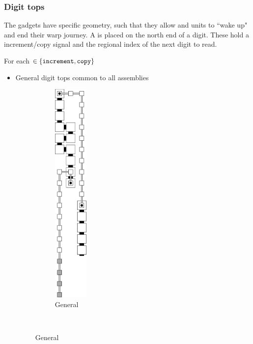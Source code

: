 \subsubsection{Digit tops}
The {\dtop} gadgets have specific geometry, such that they allow {\firstwarp} and
{\secondwarp} units to ``wake up" and end their warp journey. A {\dtop} is placed on
the north end of a digit. These hold a increment/copy signal and the regional index
of the next digit to read.
\vspace{1cm}

For each {\inc} $\in \{ {\tt increment, copy } \}$
\begin{itemize}
    \item General digit tops common to all assemblies

    \begin{figure}[H]
        \centering
        \begin{subfigure}[t]{0.2\textwidth}
            \centering
            \includegraphics[width=0.2\textwidth]{digit_tops/digit_top_general}
            \caption{\label{fig:digit_tops/digit_top_general} General }
        \end{subfigure}%
        ~
    \end{figure}


\end{itemize}
